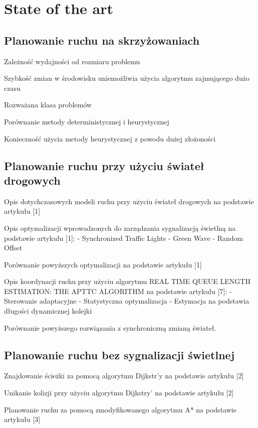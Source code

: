 
\chapter{State of the art}

\section{Planowanie ruchu na skrzyżowaniach}

Zależność wydajności od rozmiaru problemu

Szybkość zmian w środowisku uniemożliwia użycia algorytmu zajmującego dużo czasu

Rozważana klasa problemów

Porównanie metody deterministycznej i heurystycznej

Konieczność użycia metody heurystycznej z powodu dużej złożoności
\bt

\section{Planowanie ruchu przy użyciu świateł drogowych}

Opis dotychczasowych modeli ruchu przy użyciu świateł drogowych na podstawie artykułu [1]

Opis optymalizacji wprowadzonych do zarządzania sygnalizacją świetlną na podstawie artykułu [1]:
  - Synchronized Traffic Lights
  - Green Wave
  - Random Offset

Porównanie powyższych optymalizacji na podstawie artykułu [1]

Opis koordynacji ruchu przy użyciu algorytmu REAL TIME QUEUE LENGTH ESTIMATION: THE APTTC ALGORITHM na podstawie artykułu [7]:
  - Sterowanie adaptacyjne
  - Statystyczna optymalizacja
  - Estymacja na podstawia długości dynamicznej kolejki

Porównanie powyższego rozwiązania z synchroniczną zmianą świateł.

\section{Planowanie ruchu bez sygnalizacji świetlnej}

\bt

Znajdowanie ścieżki za pomocą algorytmu Dijkstr'y na podstawie artykułu [2]

Unikanie kolizji przy użyciu algorytmu Dijkstry' na podstawie artykułu [2]

Planowanie ruchu za pomocą zmodyfikowanego algorytmu A* na podstawie artykułu [3]

